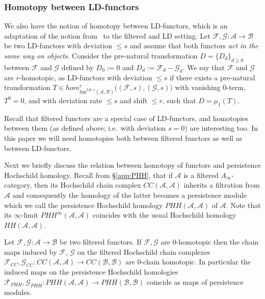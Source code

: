 \subsubsection{Homotopy between LD-functors} \label{a:homotopy} We
also have the notion of homotopy between LD-functors, which is an
adaptation of the notion
from~\cite[Section~(1h)]{Se:book-fukaya-categ} to the filtered and LD
setting. Let
$\mathcal{F}, \mathcal{G}: \mathcal{A} \longrightarrow \mathcal{B}$ be
two LD-functors with deviation $\leq s$ and assume that both functors
{\em act in the same way on objects}.  Consider the pre-natural
transformation $D = \{D_d\}_{d \geq 0}$ between $\mathcal{F}$ and
$\mathcal{G}$ defined by $D_0 := 0$ and
$D_d := \mathcal{F}_d - \mathcal{G}_d$. We say that $\mathcal{F}$ and
$\mathcal{G}$ are $r$-homotopic, as LD-functors with deviation
$\leq s$ if there exists a pre-natural transformation
$T \in hom^r_{\text{fun}^{\text{LD};s}(\mathcal{A}, \mathcal{B})}\bigl(
(\mathcal{F},s), (\mathcal{G}, s) \bigr)$ with vanishing $0$-term,
$T^0=0$, and with deviation rate $\leq s$ and shift $\leq r$, such
that $D = \mu_1(T)$.

Recall that filtered functors are a special case of LD-functors, and
homotopies between them (as defined above; i.e.~with deviation $s=0$)
are interesting too. In this paper we will need homotopies both
between filtered functors as well as between LD-functors.

Next we briefly discuss the relation between homotopy of functors and
persistence Hochschild homology. Recall from \S\ref{app:PHH}, that if $\mathcal{A}$ is a filtered
$A_{\infty}$-category, then its Hochschild chain complex
$CC(\mathcal{A}, \mathcal{A})$ inherits a filtration from
$\mathcal{A}$ and consequently the homology of the latter becomes a
persistence module which we call the persistence Hochschild homology
$PHH(\mathcal{A}, \mathcal{A})$ of $\mathcal{A}$. Note that its
$\infty$-limit $PHH^{\infty}(\mathcal{A}, \mathcal{A})$ coincides with
the usual Hochschild homology $HH(\mathcal{A}, \mathcal{A})$.
\begin{prop} \label{p:homotopy-HH} Let
  $\mathcal{F}, \mathcal{G}: \mathcal{A} \longrightarrow \mathcal{B}$
  be two filtered functors. If $\mathcal{F}, \mathcal{G}$ are
  $0$-homotopic then the chain maps induced by $\mathcal{F}$,
  $\mathcal{G}$ on the filtered Hochschild chain complexes
  $\mathcal{F}_{\scriptscriptstyle CC},
  \mathcal{G}_{\scriptscriptstyle CC}:CC(\mathcal{A}, \mathcal{A})
  \longrightarrow CC(\mathcal{B}, \mathcal{B})$ are $0$-chain
  homotopic. In particular the induced maps on the persistence
  Hochschild homologies
  $\mathcal{F}_{\scriptscriptstyle PHH},
  \mathcal{G}_{\scriptscriptstyle PHH}: PHH(\mathcal{A}, \mathcal{A})
  \longrightarrow PHH(\mathcal{B}, \mathcal{B})$ coincide as maps of
  persistence modules.
\end{prop}

